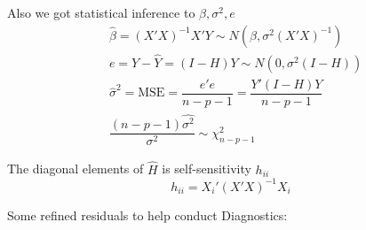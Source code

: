     Also we got statistical inference to $ \beta ,\sigma ^2, e $
    \begin{align}
        &\hat{\beta }=(X'X)^{-1}X'Y\sim N(\beta ,\sigma ^2(X'X)^{-1})\\
        &e=Y-\hat{Y}=(I-H)Y \sim N(0,\sigma ^2(I-H))\\
        &\hat{\sigma }^2=\mathrm{MSE}=\dfrac{e'e}{n-p-1}=\dfrac{Y'(I-H)Y}{n-p-1}\\
        &\dfrac{(n-p-1)\hat{\sigma ^2}}{\sigma ^2}\sim  \chi^2_{n-p-1} 
    \end{align}
 
    The diagonal elements  of $ \hat{H} $ is self-sensitivity $ h_{ii} $
    \begin{equation}
        h_{ii}=X_i'(X'X)^{-1}X_i
    \end{equation}
    
    



\begin{point}
    Some refined residuals to help conduct Diagnostics:
\end{point}
    
